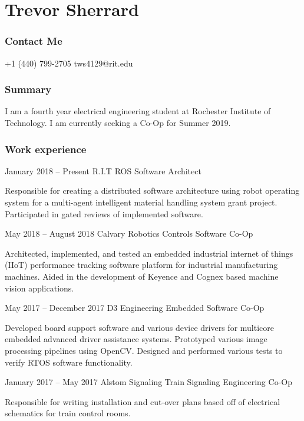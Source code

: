 \documentclass{tccv}
\begin{document}
\part{Trevor Sherrard}
\section{Contact Me}
\begin{eventlist}
    {+1 (440) 799-2705}
    {tws4129@rit.edu}
    
\end{eventlist}

\section{Summary}
I am a fourth year electrical engineering student at Rochester Institute of Technology. I am currently seeking a Co-Op for Summer 2019.

\section{Work experience}

\begin{eventlist}

\item{January 2018 -- Present}
     {R.I.T}
     {ROS Software Architect}

Responsible for creating a distributed software architecture using robot operating system for a multi-agent intelligent material handling system grant project. Participated in gated reviews of implemented software.

\item{May 2018 -- August 2018}
     {Calvary Robotics}
     {Controls Software Co-Op}

Architected, implemented, and tested an embedded industrial internet of things (IIoT) performance tracking software platform for industrial manufacturing machines. Aided in the development of Keyence and Cognex based machine vision applications.

\item{May 2017 -- December 2017}
     {D3 Engineering}
     {Embedded Software Co-Op}
     
Developed board support software and various device drivers for multicore embedded advanced driver assistance systems. Prototyped various image processing pipelines using OpenCV. Designed and performed various tests to verify RTOS software functionality.

\item{January 2017 -- May 2017}
     {Alstom Signaling}
     {Train Signaling Engineering Co-Op}

Responsible for writing installation and cut-over plans based off of electrical schematics for train control rooms.

\end{eventlist}
\end{document}
